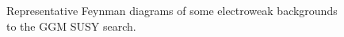 \documentclass[dissertation.tex]{subfiles}
\begin{document}
\begin{figure}
	\caption{Representative Feynman diagrams of some electroweak backgrounds to the GGM SUSY search.}
	\label{fig:EW_background_diagrams}
\end{figure}


\end{document}
